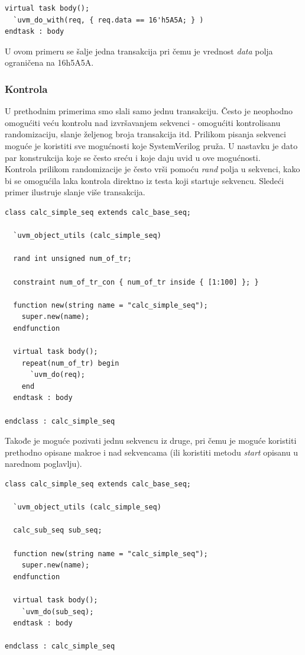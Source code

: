 \begin{lstlisting}
virtual task body();
  `uvm_do_with(req, { req.data == 16'h5A5A; } )
endtask : body
\end{lstlisting}

U ovom primeru se šalje jedna transakcija pri čemu je vrednost \emph{data} polja
ograničena na 16\textquotesingle h5A5A.

\subsubsection{Kontrola}

U prethodnim primerima smo slali samo jednu transakciju. Često je neophodno
omogućiti veću kontrolu nad izvršavanjem sekvenci - omogućiti kontrolisanu
randomizaciju, slanje željenog broja transakcija itd. Prilikom pisanja sekvenci
moguće je koristiti sve mogućnosti koje SystemVerilog pruža. U nastavku je dato
par konstrukcija koje se često sreću i koje daju uvid u ove mogućnosti.\\

Kontrola prilikom randomizacije je često vrši pomoću \emph{rand} polja u
sekvenci, kako bi se omogućila laka kontrola direktno iz testa koji startuje
sekvencu. Sledeći primer ilustruje slanje više transakcija.

\begin{lstlisting}
class calc_simple_seq extends calc_base_seq;

  `uvm_object_utils (calc_simple_seq)

  rand int unsigned num_of_tr;

  constraint num_of_tr_con { num_of_tr inside { [1:100] }; }

  function new(string name = "calc_simple_seq");
    super.new(name);
  endfunction

  virtual task body();
    repeat(num_of_tr) begin
      `uvm_do(req);
    end
  endtask : body

endclass : calc_simple_seq
\end{lstlisting}

Takođe je moguće pozivati jednu sekvencu iz druge, pri čemu je moguće koristiti
prethodno opisane makroe i nad sekvencama (ili koristiti metodu \emph{start}
opisanu u narednom poglavlju).

\begin{lstlisting}
class calc_simple_seq extends calc_base_seq;

  `uvm_object_utils (calc_simple_seq)

  calc_sub_seq sub_seq;

  function new(string name = "calc_simple_seq");
    super.new(name);
  endfunction

  virtual task body();
    `uvm_do(sub_seq);
  endtask : body

endclass : calc_simple_seq
\end{lstlisting}

